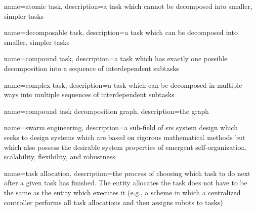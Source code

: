  {
  name={atomic task},
  description={a task which cannot be decomposed into smaller, simpler tasks}
}

 {
  name={decomposable task},
  description={a task which can be decomposed into smaller, simpler tasks}
}

{
  name={compound task},
  description={a task which has exactly one possible decomposition into
    a sequence of interdependent subtasks}
}

{
  name={complex task},
  description={a task which can be decomposed in multiple ways into multiple
    sequences of interdependent subtasks
  }
}

{
  name={compound task decomposition graph},
  description={the graph }
}

{
  name={swarm engineering},
  description={a sub-field of \gls{srs} system design which seeks to
    design systems which are based on rigorous mathematical methods but which
    also possess the desirable system properties of emergent self-organization,
    scalability, flexibility, and robustness } }

{
  name={task allocation},
  description={the process of choosing which task to do next after a given task
    has finished. The entity allocates the task does not have to be the same as
    the entity which executes it (e.g., a scheme in which a centralized
    controller performs all task allocations and then assigns robots to tasks)
  }
}
